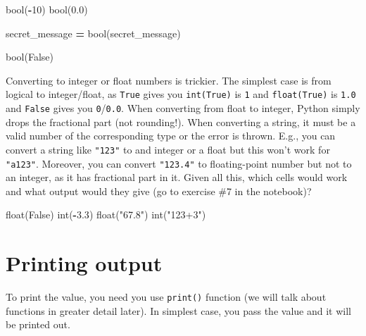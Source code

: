 \documentclass[
]{book}
\newenvironment{Shaded}{\begin{snugshade}}{\end{snugshade}}
\newcommand{\BuiltInTok}[1]{#1}
\newcommand{\DecValTok}[1]{\textcolor[rgb]{0.00,0.00,0.81}{#1}}
\newcommand{\FloatTok}[1]{\textcolor[rgb]{0.00,0.00,0.81}{#1}}
\newcommand{\NormalTok}[1]{#1}
\newcommand{\OperatorTok}[1]{\textcolor[rgb]{0.81,0.36,0.00}{\textbf{#1}}}
\newcommand{\StringTok}[1]{\textcolor[rgb]{0.31,0.60,0.02}{#1}}
\newcommand{\VariableTok}[1]{\textcolor[rgb]{0.00,0.00,0.00}{#1}}
\begin{document}
\begin{Shaded}
\begin{Highlighting}[]
\BuiltInTok{bool}\NormalTok{(}\OperatorTok{{-}}\DecValTok{10}\NormalTok{)}
\BuiltInTok{bool}\NormalTok{(}\FloatTok{0.0}\NormalTok{)}

\NormalTok{secret\_message }\OperatorTok{=} \StringTok{\textquotesingle{}\textquotesingle{}}
\BuiltInTok{bool}\NormalTok{(secret\_message)}

\BuiltInTok{bool}\NormalTok{(}\StringTok{\textquotesingle{}False\textquotesingle{}}\NormalTok{)}
\end{Highlighting}
\end{Shaded}

Converting to integer or float numbers is trickier. The simplest case is from logical to integer/float, as \texttt{True} gives you \texttt{int(True)} is \texttt{1} and \texttt{float(True)} is \texttt{1.0} and \texttt{False} gives you \texttt{0}/\texttt{0.0}. When converting from float to integer, Python simply drops the fractional part (not rounding!). When converting a string, it must be a valid number of the corresponding type or the error is thrown. E.g., you can convert a string like \texttt{"123"} to and integer or a float but this won't work for \texttt{"a123"}. Moreover, you can convert \texttt{"123.4"} to floating-point number but not to an integer, as it has fractional part in it. Given all this, which cells would work and what output would they give (go to exercise \#7 in the notebook)?

\begin{Shaded}
\begin{Highlighting}[]
\BuiltInTok{float}\NormalTok{(}\VariableTok{False}\NormalTok{)}
\BuiltInTok{int}\NormalTok{(}\OperatorTok{{-}}\FloatTok{3.3}\NormalTok{)}
\BuiltInTok{float}\NormalTok{(}\StringTok{"67.8"}\NormalTok{)}
\BuiltInTok{int}\NormalTok{(}\StringTok{"123+3"}\NormalTok{)}
\end{Highlighting}
\end{Shaded}

\hypertarget{printing-output}{%
\section{Printing output}\label{printing-output}}

To print the value, you need you use \texttt{print()} function (we will talk about functions in greater detail later). In simplest case, you pass the value and it will be printed out.
\end{document}
